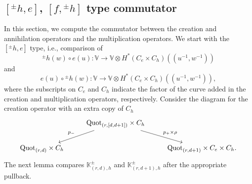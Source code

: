 \documentclass[10pt]{amsart}
\newcommand{\BK}{\mathbb{K}}
\newcommand{\BV}{\mathbb{V}}
\newcommand{\Quot}{\textnormal{Quot}}
\newcommand{\+}{{}^+}
\theoremstyle{definition}
\theoremstyle {definition}
\theoremstyle {definition}
\begin{document}
\subsection{$[{}^{\pm}h,e]$, $[f,{}^{\pm}h]$ type commutator}


In this section, we compute the commutator between the creation and annihilation operators and the multiplication operators. We start with the $[{}^{\pm}h,e]$ type, i.e., comparison of 
$${}^{\pm}h(w)\circ e(u):\BV\rightarrow \BV\otimes H^*(C_e\times C_h)(\!(u^{-1},w^{-1})\!)
$$
and 
$$e(u)\circ {}^{\pm}h(w):\BV\rightarrow \BV\otimes H^*(C_e\times C_h)(\!(u^{-1},w^{-1})\!),
$$
where the subscripts on $C_e$ and $C_h$ indicate the factor of the curve added in the creation and multiplication operators, respectively. Consider the diagram for the creation operator with an extra copy of $C_h$
\begin{equation}\label{eq: [h,e] diagram}
\begin{tikzcd}
  & \Quot_{(r, [d,d+1])} \times C_h\arrow[ld, "p_-"'] \arrow[rd, "p_+\times \rho"] &   \\
\Quot_{(r,d)} \times C_h&                                    & \Quot_{(r,d+1)}\times C_e\times C_h.
\end{tikzcd}
\end{equation}
The next lemma compares $\BK^\pm_{(r,d),h}$ and $\BK^\pm_{(r,d+1),h}$ after the appropriate pullback.
\end{document}
